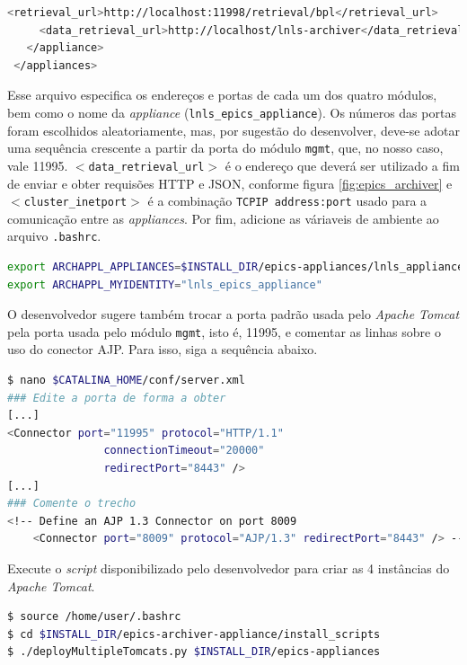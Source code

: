\begin {enumerate}[i.]
\begin{lstlisting}[language=bash, style=nonumbers]
     <retrieval_url>http://localhost:11998/retrieval/bpl</retrieval_url>
     <data_retrieval_url>http://localhost/lnls-archiver</data_retrieval_url>
   </appliance>
 </appliances>
\end{lstlisting} 
Esse arquivo especifica os endereços e portas de cada um dos quatro módulos, bem
como o nome da \textit{appliance} (\texttt{lnls\_epics\_appliance}). Os números
das portas foram escolhidos aleatoriamente, mas, por sugestão do desenvolver,
deve-se adotar uma sequência crescente a partir da porta do módulo
\texttt{mgmt}, que, no nosso caso, vale 11995.
\texttt{\(<\)data\_retrieval\_url\(>\)} é o endereço que deverá ser utilizado
a fim de enviar e obter requisões HTTP e JSON, conforme figura
\ref{fig:epics_archiver} e \texttt{\(<\)cluster\_inetport\(>\)} é a combinação
\texttt{TCPIP address:port} usado para a comunicação entre as
\textit{appliances}. Por fim, adicione as váriaveis de ambiente ao arquivo
\texttt{.bashrc}.

\begin{lstlisting}[language=bash, style=nonumbers]
export ARCHAPPL_APPLIANCES=$INSTALL_DIR/epics-appliances/lnls_appliances.xml
export ARCHAPPL_MYIDENTITY="lnls_epics_appliance"
\end{lstlisting}


O desenvolvedor sugere também trocar a porta padrão usada pelo \textit{Apache
Tomcat} pela porta usada pelo módulo \texttt{mgmt}, isto é, 11995, e comentar
as linhas sobre o uso do conector AJP. Para isso, siga a sequência abaixo.

\begin{lstlisting}[language=bash, style=nonumbers]
$ nano $CATALINA_HOME/conf/server.xml
### Edite a porta de forma a obter
[...]
<Connector port="11995" protocol="HTTP/1.1"
               connectionTimeout="20000"
               redirectPort="8443" />
[...]
### Comente o trecho
<!-- Define an AJP 1.3 Connector on port 8009 
    <Connector port="8009" protocol="AJP/1.3" redirectPort="8443" /> -->
\end{lstlisting}

Execute o \textit{script} disponibilizado pelo desenvolvedor para criar as 4
instâncias do \textit{Apache Tomcat}.

\begin{lstlisting}[language=bash, style=nonumbers]
$ source /home/user/.bashrc
$ cd $INSTALL_DIR/epics-archiver-appliance/install_scripts
$ ./deployMultipleTomcats.py $INSTALL_DIR/epics-appliances
\end{lstlisting}


\end{enumerate}
